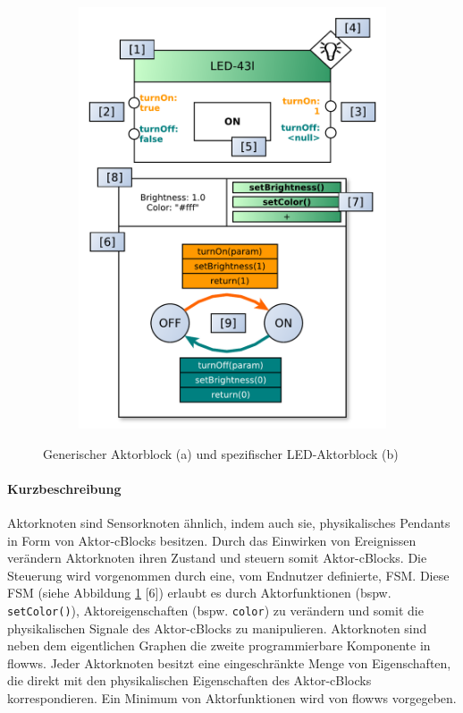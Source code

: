 \begin{figure}[h]
\begin{subfigure}{.55\textwidth}
  \includegraphics[width=1\linewidth]{bilder/chapter4/chapter4_3/instanceLEDactornode.pdf}
  \caption{}
  \label{fig:actorled}
\end{subfigure}
    \caption{Generischer Aktorblock (a) und spezifischer LED-Aktorblock (b)}
    \label{fig:actornodes}
\end{figure}


\paragraph{Kurzbeschreibung} Aktorknoten sind Sensorknoten ähnlich, indem auch sie, physikalisches Pendants in Form von Aktor-cBlocks besitzen. Durch das Einwirken von Ereignissen verändern Aktorknoten ihren Zustand und steuern somit Aktor-cBlocks. Die Steuerung wird vorgenommen durch eine, vom Endnutzer definierte, \ac{FSM}. Diese \ac{FSM} (siehe Abbildung \ref{fig:actorled} [6]) erlaubt es durch Aktorfunktionen (bspw. \texttt{setColor()}), Aktoreigenschaften (bspw. \texttt{color}) zu verändern und somit die physikalischen Signale des Aktor-cBlocks zu manipulieren. Aktorknoten sind neben dem eigentlichen Graphen die zweite programmierbare Komponente in flowws. Jeder Aktorknoten besitzt eine eingeschränkte Menge von Eigenschaften, die direkt mit den physikalischen Eigenschaften des Aktor-cBlocks korrespondieren. Ein Minimum von Aktorfunktionen wird von flowws vorgegeben.

